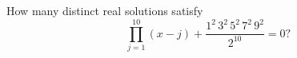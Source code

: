 How many distinct real solutions satisfy
\[
\prod_{j=1}^{10}(x-j)+\dfrac{1^2\,3^2\,5^2\,7^2\,9^2}{2^{10}}=0?
\]
